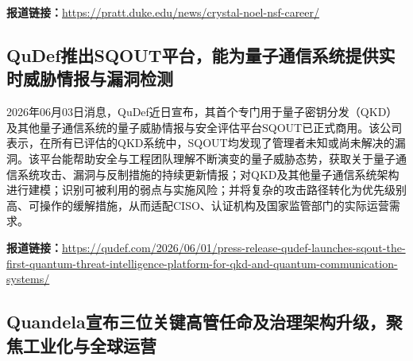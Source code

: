 \documentclass[12pt,a4paper]{ctexart}
\begin{document}
\noindent\textbf{报道链接：}\url{https://pratt.duke.edu/news/crystal-noel-nsf-career/}

\subsection{ QuDef推出SQOUT平台，能为量子通信系统提供实时威胁情报与漏洞检测 }

2026年06月03日消息，QuDef近日宣布，其首个专门用于量子密钥分发（QKD）及其他量子通信系统的量子威胁情报与安全评估平台SQOUT已正式商用。该公司表示，在所有已评估的QKD系统中，SQOUT均发现了管理者未知或尚未解决的漏洞。该平台能帮助安全与工程团队理解不断演变的量子威胁态势，获取关于量子通信系统攻击、漏洞与反制措施的持续更新情报；对QKD及其他量子通信系统架构进行建模；识别可被利用的弱点与实施风险；并将复杂的攻击路径转化为优先级别高、可操作的缓解措施，从而适配CISO、认证机构及国家监管部门的实际运营需求。

\noindent\textbf{报道链接：}\url{https://qudef.com/2026/06/01/press-release-qudef-launches-sqout-the-first-quantum-threat-intelligence-platform-for-qkd-and-quantum-communication-systems/}

\subsection{ Quandela宣布三位关键高管任命及治理架构升级，聚焦工业化与全球运营 }
\end{document}
